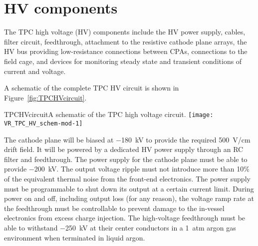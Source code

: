 




\section{HV components}

The TPC high voltage (HV) components include the HV power supply, cables,
filter circuit, feedthrough, attachment to the resistive cathode plane
arrays, the HV bus providing low-resistance connections between CPAs,
connections to the field cage, and devices for monitoring steady state
and transient conditions of current and voltage.

A schematic of the complete TPC HV circuit is shown in Figure~\ref{fig:TPCHVcircuit}.

\begin{cdrfigure}{TPCHVcircuit}{A schematic of the TPC high voltage circuit.}
  \texttt{[image: VR\_TPC\_HV\_schem-mod-1]}
\end{cdrfigure}


The cathode plane will be biased at \SI{-180}{kV} to provide the
required \SI{500}{V/cm} drift field.  It will be
powered by a dedicated HV power supply through an RC filter and
feedthrough.  The power supply for the cathode plane must be able
to provide \SI{-200}{kV}.  The output voltage
ripple must not introduce more than 10\%
of the equivalent thermal
noise from the front-end electronics. The power supply must be
programmable to shut down its output at a certain current
limit. During power on and off, including output loss (for any
reason), the voltage ramp rate at the feedthrough must be controllable
to prevent damage to the in-vessel electronics from excess charge
injection. The high-voltage feedthrough must be able to withstand \SI{-250}{kV}
at their center conductors in a \SI{1}{atm} argon gas environment when
terminated in liquid argon.

